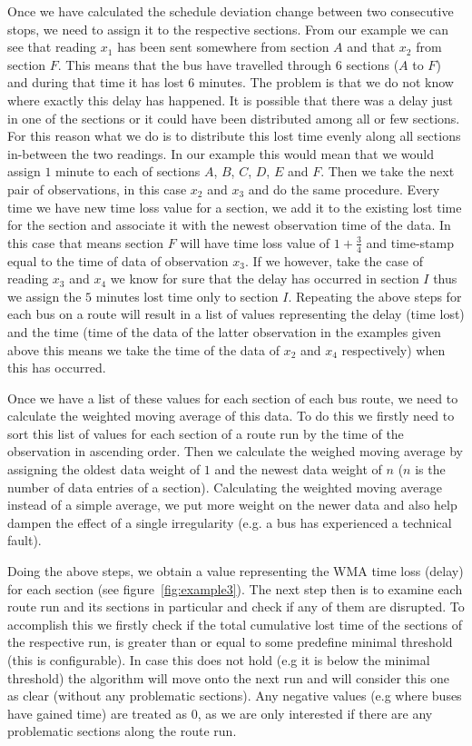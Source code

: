 Once we have calculated the schedule deviation change between two consecutive stops, we need to assign it to the respective sections. From our example we can see that reading $x_1$ has been sent somewhere from section $A$ and that $x_2$ from section $F$. This means that the bus have travelled through 6 sections ($A$ to $F$) and during that time it has lost $6$ minutes. The problem is that we do not know where exactly this delay has happened. It is possible that there was a delay just in one of the sections or it could have been distributed among all or few sections. For this reason what we do is to distribute this lost time evenly along all sections in-between the two readings. In our example this would mean that we would assign $1$ minute to each of sections $A$, $B$, $C$, $D$, $E$ and $F$. Then we take the next pair of observations, in this case $x_2$ and $x_3$ and do the same procedure. Every time we have new time loss value for a section, we add it to the existing lost time for the section and associate it with the newest observation time of the data. In this case that means section $F$ will have time loss value of $1+\frac{3}{4}$ and time-stamp equal to the time of data of observation $x_3$. If we however, take the case of reading $x_3$ and $x_4$ we know for sure that the delay has occurred in section $I$ thus we assign the $5$ minutes lost time only to section $I$. Repeating the above steps for each bus on a route will result in a list of values representing the delay (time lost) and the time (time of the data of the latter observation in the examples given above this means we take the time of the data of $x_2$ and $x_4$ respectively) when this has occurred.
 
Once we have a list of these values for each section of each bus route, we need to calculate the weighted moving average of this data. To do this we firstly need to sort this list of values for each section of a route run by the time of the observation in ascending order. Then we calculate the weighed moving average by assigning the oldest data weight of $1$ and the newest data weight of $n$ ($n$ is the number of data entries of a section). Calculating the weighted moving average instead of a simple average, we put more weight on the newer data and also help dampen the effect of a single irregularity (e.g. a bus has experienced a technical fault).

Doing the above steps, we obtain a value representing the WMA time loss (delay) for each section (see figure~\ref{fig:example3}). The next step then is to examine each route run and its sections in particular and check if any of them are disrupted. To accomplish this we firstly check if the total cumulative lost time of the sections of the respective run, is greater than or equal to some predefine minimal threshold (this is configurable). In case this does not hold (e.g it is below the minimal threshold) the algorithm will move onto the next run and will consider this one as clear (without any problematic sections). Any negative values (e.g where buses have gained time) are treated as $0$, as we are only interested if there are any problematic sections along the route run.

